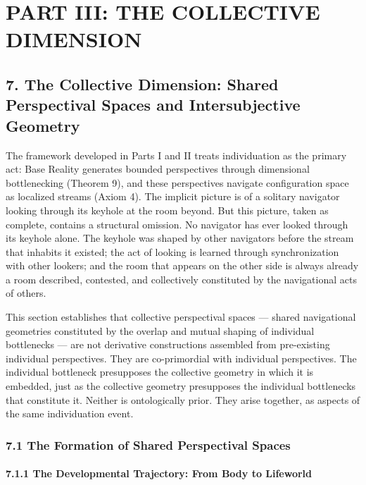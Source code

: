 \section*{PART III: THE COLLECTIVE DIMENSION}


\subsection*{7. The Collective Dimension: Shared Perspectival Spaces and Intersubjective Geometry}


The framework developed in Parts I and II treats individuation as the primary act: Base Reality generates bounded perspectives through dimensional bottlenecking (Theorem 9), and these perspectives navigate configuration space as localized streams (Axiom 4). The implicit picture is of a solitary navigator looking through its keyhole at the room beyond. But this picture, taken as complete, contains a structural omission. No navigator has ever looked through its keyhole alone. The keyhole was shaped by other navigators before the stream that inhabits it existed; the act of looking is learned through synchronization with other lookers; and the room that appears on the other side is always already a room described, contested, and collectively constituted by the navigational acts of others.


This section establishes that collective perspectival spaces — shared navigational geometries constituted by the overlap and mutual shaping of individual bottlenecks — are not derivative constructions assembled from pre-existing individual perspectives. They are co-primordial with individual perspectives. The individual bottleneck presupposes the collective geometry in which it is embedded, just as the collective geometry presupposes the individual bottlenecks that constitute it. Neither is ontologically prior. They arise together, as aspects of the same individuation event.


\bigskip\noindent\makebox[\textwidth]{\color{rulegray}\rule{5cm}{0.3pt}}\bigskip


\subsubsection*{7.1 The Formation of Shared Perspectival Spaces}


\paragraph*{7.1.1 The Developmental Trajectory: From Body to Lifeworld}


